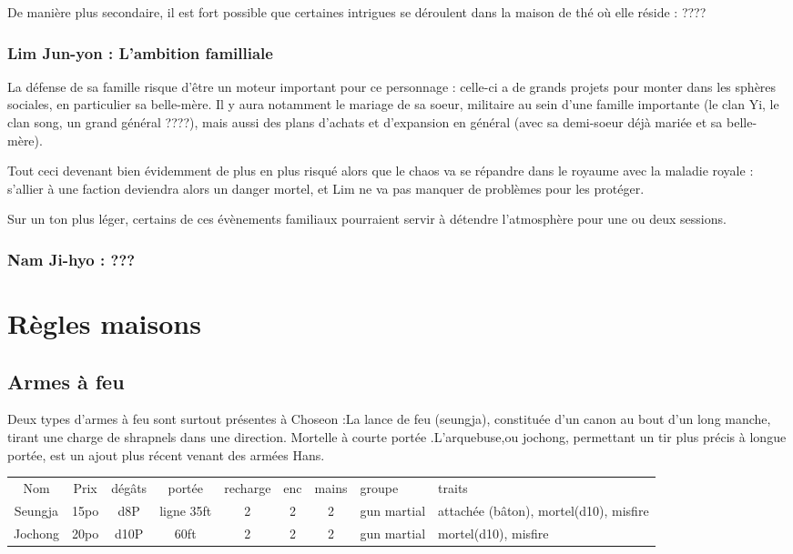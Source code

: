 \documentclass[10pt,a4paper]{book}
\begin{document}
De manière plus secondaire, il est fort possible que certaines intrigues se déroulent dans la maison de thé où elle réside : ????
\subsection{Lim Jun-yon : L'ambition familliale}
La défense de sa famille risque d'être un moteur important pour ce personnage : celle-ci a de grands projets pour monter dans les sphères sociales, en particulier sa belle-mère. Il y aura notamment le mariage de sa soeur, militaire au sein d'une famille importante (le clan Yi, le clan song, un grand général ????), mais aussi des plans d'achats et d'expansion en général (avec sa demi-soeur déjà mariée et sa belle-mère). 

Tout ceci devenant bien évidemment de plus en plus risqué alors que le chaos va se répandre dans le royaume avec la maladie royale : s'allier à une faction deviendra alors un danger mortel, et Lim ne va pas manquer de problèmes pour les protéger.

Sur un ton plus léger, certains de ces évènements familiaux pourraient servir à détendre l'atmosphère pour une ou deux sessions.
\subsection{Nam Ji-hyo : ???}
\chapter{Règles maisons}
\section{Armes à feu}
Deux types d'armes à feu sont surtout présentes à Choseon :La lance de feu (seungja), constituée d'un canon au bout d'un long manche, tirant une charge de shrapnels dans une direction. Mortelle à courte portée .L'arquebuse,ou jochong, permettant un tir plus précis à longue portée, est un ajout plus récent venant des armées Hans.

\flushleft
\begin{tabular}{c c c c c c c p{} p{}}
Nom & Prix & dégâts & portée & recharge & enc & mains & groupe & traits \\
Seungja & 15po & d8P & ligne 35ft & 2 & 2 & 2 & gun martial & attachée (bâton), mortel(d10), misfire \\
Jochong & 20po & d10P & 60ft & 2 & 2 & 2 & gun martial & mortel(d10), misfire\\
\end{tabular}
\end{document}
